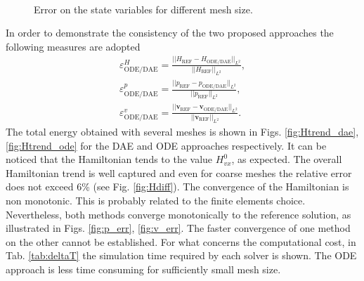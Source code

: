 \begin{figure}[ht]%
	\centering
	\hspace{8pt}%
	 \\
	\caption[]{Error on the state variables for different mesh size.}%
	\label{fig:error_x}%
\end{figure}

In order to demonstrate the consistency of the two proposed approaches the following measures are adopted
\begin{align*}
\varepsilon^{H}_{\text{ODE}/\text{DAE}} = \frac{||H_{\text{REF}} - H_{\text{ODE}/\text{DAE}} ||_{L^2}}{||H_{\text{REF}}||_{L^2}}, \\
\varepsilon^p_{\text{ODE}/\text{DAE}} = \frac{||p_{\text{REF}} - p_{\text{ODE}/\text{DAE}} ||_{L^2}}{||p_{\text{REF}}||_{L^2}}, \\
\varepsilon^v_{\text{ODE}/\text{DAE}} = \frac{||\bm{v}_{\text{REF}} - \bm{v}_{\text{ODE}/\text{DAE}} ||_{L^2}}{||\bm{v}_{\text{REF}}||_{L^2}}. 
\end{align*}
The total energy obtained with several meshes is shown in Figs. \ref{fig:Htrend_dae}, \ref{fig:Htrend_ode} for the DAE and ODE approaches respectively. It can be noticed that the Hamiltonian tends to the value $H_{vx}^0$, as expected. The overall Hamiltonian trend is well captured and even for coarse meshes the relative error does not exceed 6\% (see Fig. \ref{fig:Hdiff}). The convergence of the Hamiltonian is non monotonic. This is probably related to the finite elements choice. Nevertheless, both methods converge monotonically to the reference solution, as illustrated in Figs. \ref{fig:p_err}, \ref{fig:v_err}. The faster convergence of one method on the other cannot be established. For what concerns the computational cost, in Tab. \ref{tab:deltaT} the simulation time required by each solver is shown. The ODE approach is less time consuming for sufficiently small mesh size.

